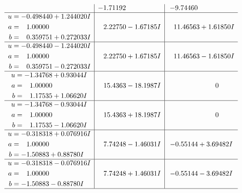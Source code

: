 \documentclass[1p]{elsarticle_modified}
\theoremstyle{definition}
\begin{document}
$$\begin{array}{c|c|c}
 & -1.71192\phantom{ +0.000000I} & -9.74460\phantom{ +0.000000I} \\ \hline\begin{aligned}
u &= -0.498440 + 1.244020 I \\
a &= \phantom{-}1.00000\phantom{ +0.000000I} \\
b &= \phantom{-}0.359751 + 0.272033 I\end{aligned}
 & \phantom{-}2.22750 - 1.67185 I & \phantom{-}11.46563 + 1.61850 I \\ \hline\begin{aligned}
u &= -0.498440 - 1.244020 I \\
a &= \phantom{-}1.00000\phantom{ +0.000000I} \\
b &= \phantom{-}0.359751 - 0.272033 I\end{aligned}
 & \phantom{-}2.22750 + 1.67185 I & \phantom{-}11.46563 - 1.61850 I \\ \hline\begin{aligned}
u &= -1.34768 + 0.93044 I \\
a &= \phantom{-}1.00000\phantom{ +0.000000I} \\
b &= \phantom{-}1.17535 + 1.06620 I\end{aligned}
 & \phantom{-}15.4363 - 18.1987 I & \phantom{-0.000000 } 0 \\ \hline\begin{aligned}
u &= -1.34768 - 0.93044 I \\
a &= \phantom{-}1.00000\phantom{ +0.000000I} \\
b &= \phantom{-}1.17535 - 1.06620 I\end{aligned}
 & \phantom{-}15.4363 + 18.1987 I & \phantom{-0.000000 } 0 \\ \hline\begin{aligned}
u &= -0.318318 + 0.076916 I \\
a &= \phantom{-}1.00000\phantom{ +0.000000I} \\
b &= -1.50883 + 0.88780 I\end{aligned}
 & \phantom{-}7.74248 - 1.46031 I & -0.55144 + 3.69482 I \\ \hline\begin{aligned}
u &= -0.318318 - 0.076916 I \\
a &= \phantom{-}1.00000\phantom{ +0.000000I} \\
b &= -1.50883 - 0.88780 I\end{aligned}
 & \phantom{-}7.74248 + 1.46031 I & -0.55144 - 3.69482 I\\
 \hline 
 \end{array}$$\newpage$$\begin{array}{c|c|c}  

\end{array}$$
\end{document}

